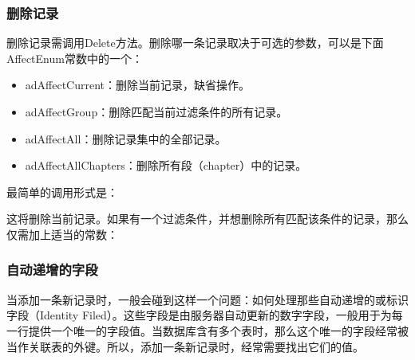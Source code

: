 \subsubsection{删除记录}

删除记录需调用Delete方法。删除哪一条记录取决于可选的参数，可以是下面AffectEnum常数中的一个：
\begin{itemize}[]
\item adAffectCurrent：删除当前记录，缺省操作。

\item adAffectGroup：删除匹配当前过滤条件的所有记录。

\item adAffectAll：删除记录集中的全部记录。

\item adAffectAllChapters：删除所有段（chapter）中的记录。
\end{itemize}
最简单的调用形式是：


这将删除当前记录。如果有一个过滤条件，并想删除所有匹配该条件的记录，那么仅需加上适当的常数：


\subsubsection{自动递增的字段}

当添加一条新记录时，一般会碰到这样一个问题：如何处理那些自动递增的或标识字段（Identity Filed）。这些字段是由服务器自动更新的数字字段，一般用于为每一行提供一个唯一的字段值。当数据库含有多个表时，那么这个唯一的字段经常被当作关联表的外键。所以，添加一条新记录时，经常需要找出它们的值。

